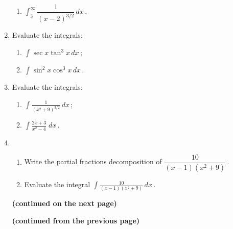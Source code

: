 \documentclass[10pt]{article}
\begin{document}
\begin{enumerate}
\begin{multicols}{2}
\begin{enumerate}
\item $\displaystyle{\int_{3}^{\infty}\dfrac{1}{(x-2)^{3/2}}\,dx}$\,.

\end{enumerate}
\end{multicols}

\item Evaluate the integrals:

\begin{multicols}{2}
\begin{enumerate}

\item  $\displaystyle\int \sec x \tan^3 x \,dx$\,;

\item  $\displaystyle\int \sin^2 x \cos^3 x\, dx$\,.

\end{enumerate}
\end{multicols}

\item Evaluate the integrals:

\begin{multicols}{2}
\begin{enumerate}

\item $\displaystyle\int\frac{1}{(x^2+9)^{3/2}}\,dx$\,;

\item $\displaystyle \int \frac{2x+3}{x^2-4} \; dx$\,.

\end{enumerate}
\end{multicols}

\item 
\begin{enumerate}

\item Write the partial fractions decomposition of $\dfrac{10}{(x-1)(x^2+9)}$\,.

\item Evaluate the integral $\displaystyle\int\frac{10}{(x-1)(x^2+9)}\,dx$\,.

\end{enumerate}


\begin{center}
\textbf{(continued on the next page)}
\end{center}

\newpage

\begin{center}
\textbf{(continued from the previous page)}
\end{center}


\end{enumerate}
\end{document}
